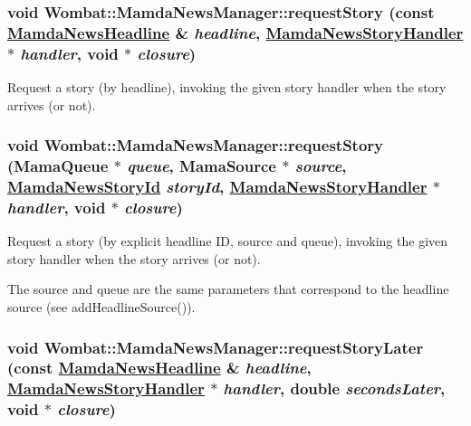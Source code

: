 \hypertarget{classWombat_1_1MamdaNewsManager_bcefa38c01848fdaf6e126fb999f271a}{
\subsubsection[requestStory]{\setlength{\rightskip}{0pt plus 5cm}void Wombat::Mamda\-News\-Manager::request\-Story (const \hyperlink{classWombat_1_1MamdaNewsHeadline}{Mamda\-News\-Headline} \& {\em headline}, \hyperlink{classWombat_1_1MamdaNewsStoryHandler}{Mamda\-News\-Story\-Handler} $\ast$ {\em handler}, void $\ast$ {\em closure})}}
\label{classWombat_1_1MamdaNewsManager_bcefa38c01848fdaf6e126fb999f271a}


Request a story (by headline), invoking the given story handler when the story arrives (or not). 

\hypertarget{classWombat_1_1MamdaNewsManager_7af48a00fc94e2ccbb6d9da13561e975}{
\subsubsection[requestStory]{\setlength{\rightskip}{0pt plus 5cm}void Wombat::Mamda\-News\-Manager::request\-Story (Mama\-Queue $\ast$ {\em queue}, Mama\-Source $\ast$ {\em source}, \hyperlink{namespaceWombat_f7b94f4bb44eb78420c0d3ba0413424e}{Mamda\-News\-Story\-Id} {\em story\-Id}, \hyperlink{classWombat_1_1MamdaNewsStoryHandler}{Mamda\-News\-Story\-Handler} $\ast$ {\em handler}, void $\ast$ {\em closure})}}
\label{classWombat_1_1MamdaNewsManager_7af48a00fc94e2ccbb6d9da13561e975}


Request a story (by explicit headline ID, source and queue), invoking the given story handler when the story arrives (or not). 

The source and queue are the same parameters that correspond to the headline source (see add\-Headline\-Source()). \hypertarget{classWombat_1_1MamdaNewsManager_737d88d1fcb9731a9ba4aed3e6f1c901}{
\subsubsection[requestStoryLater]{\setlength{\rightskip}{0pt plus 5cm}void Wombat::Mamda\-News\-Manager::request\-Story\-Later (const \hyperlink{classWombat_1_1MamdaNewsHeadline}{Mamda\-News\-Headline} \& {\em headline}, \hyperlink{classWombat_1_1MamdaNewsStoryHandler}{Mamda\-News\-Story\-Handler} $\ast$ {\em handler}, double {\em seconds\-Later}, void $\ast$ {\em closure})}}
\label{classWombat_1_1MamdaNewsManager_737d88d1fcb9731a9ba4aed3e6f1c901}


